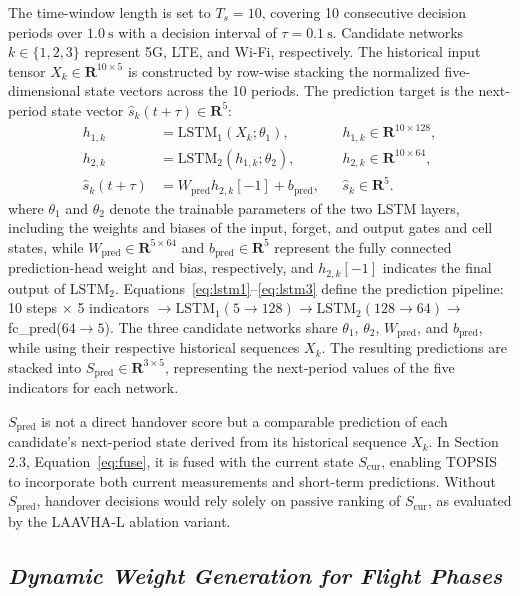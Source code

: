 \documentclass[10pt,a4paper]{article}
\begin{document}
The time-window length is set to $T_s=10$, covering 10 consecutive decision periods over $1.0~\mathrm{s}$ with a decision interval of $\tau=0.1~\mathrm{s}$. Candidate networks $k\in\{1,2,3\}$ represent 5G, LTE, and Wi-Fi, respectively. The historical input tensor $X_k\in\mathbf{R}^{10\times5}$ is constructed by row-wise stacking the normalized five-dimensional state vectors across the 10 periods. The prediction target is the next-period state vector $\hat{s}_k(t+\tau)\in\mathbf{R}^5$:
\begin{align}
h_{1,k} &= \mathrm{LSTM}_1(X_k;\theta_1), && h_{1,k}\in\mathbf{R}^{10\times128}, \label{eq:lstm1}\\
h_{2,k} &= \mathrm{LSTM}_2(h_{1,k};\theta_2), && h_{2,k}\in\mathbf{R}^{10\times64}, \label{eq:lstm2}\\
\hat{s}_k(t+\tau) &= W_{\mathrm{pred}}h_{2,k}[-1]+b_{\mathrm{pred}}, && \hat{s}_k\in\mathbf{R}^5. \label{eq:lstm3}
\end{align}
where $\theta_1$ and $\theta_2$ denote the trainable parameters of the two LSTM layers, including the weights and biases of the input, forget, and output gates and cell states, while $W_{\mathrm{pred}}\in\mathbf{R}^{5\times64}$ and $b_{\mathrm{pred}}\in\mathbf{R}^5$ represent the fully connected prediction-head weight and bias, respectively, and $h_{2,k}[-1]$ indicates the final output of $\mathrm{LSTM}_2$. Equations~\eqref{eq:lstm1}--\eqref{eq:lstm3} define the prediction pipeline: 10 steps $\times$ 5 indicators $\rightarrow\mathrm{LSTM}_1(5\rightarrow128)\rightarrow\mathrm{LSTM}_2(128\rightarrow64)\rightarrow$fc\_pred($64\rightarrow5$). The three candidate networks share $\theta_1$, $\theta_2$, $W_{\mathrm{pred}}$, and $b_{\mathrm{pred}}$, while using their respective historical sequences $X_k$. The resulting predictions are stacked into $S_{\mathrm{pred}}\in\mathbf{R}^{3\times5}$, representing the next-period values of the five indicators for each network.

$S_{\mathrm{pred}}$ is not a direct handover score but a comparable prediction of each candidate's next-period state derived from its historical sequence $X_k$. In Section 2.3, Equation~\eqref{eq:fuse}, it is fused with the current state $S_{\mathrm{cur}}$, enabling TOPSIS to incorporate both current measurements and short-term predictions. Without $S_{\mathrm{pred}}$, handover decisions would rely solely on passive ranking of $S_{\mathrm{cur}}$, as evaluated by the LAAVHA-L ablation variant.

\subsection{\textit{Dynamic Weight Generation for Flight Phases}}
\end{document}
